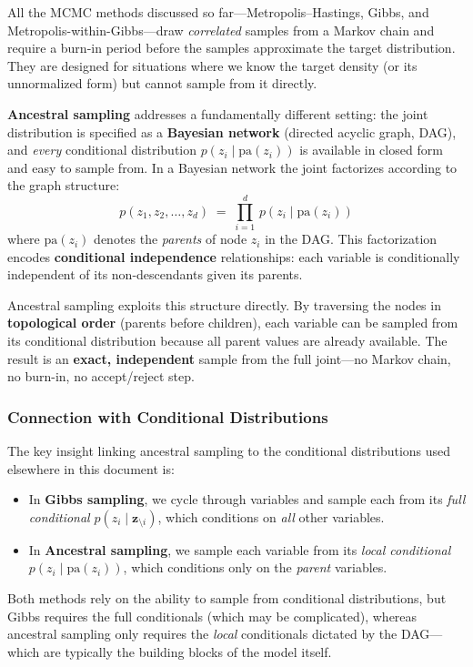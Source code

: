 \documentclass[12pt, a4paper]{article}
\begin{document}
All the MCMC methods discussed so far---Metropolis--Hastings,
Gibbs, and Metropolis-within-Gibbs---draw \emph{correlated}
samples from a Markov chain and require a burn-in period before
the samples approximate the target distribution.  They are
designed for situations where we know the target density (or its
unnormalized form) but cannot sample from it directly.

\textbf{Ancestral sampling} addresses a fundamentally different
setting: the joint distribution is specified as a
\textbf{Bayesian network} (directed acyclic graph, DAG), and
\emph{every} conditional distribution $p(z_i \mid \mathrm{pa}(z_i))$
is available in closed form and easy to sample from.  In a Bayesian
network the joint factorizes according to the graph structure:
\begin{equation}
    p(z_1, z_2, \ldots, z_d)
    \;=\;
    \prod_{i=1}^{d}\, p\!\left(z_i \mid \mathrm{pa}(z_i)\right)
    \label{eq:bn_factorization}
\end{equation}
where $\mathrm{pa}(z_i)$ denotes the \emph{parents} of node $z_i$
in the DAG.  This factorization encodes \textbf{conditional
independence} relationships: each variable is conditionally
independent of its non-descendants given its parents.

Ancestral sampling exploits this structure directly.  By
traversing the nodes in \textbf{topological order} (parents
before children), each variable can be sampled from its
conditional distribution because all parent values are already
available.  The result is an \textbf{exact, independent} sample
from the full joint---no Markov chain, no burn-in, no
accept/reject step.

\subsubsection{Connection with Conditional Distributions}

The key insight linking ancestral sampling to the conditional
distributions used elsewhere in this document is:
\begin{itemize}
    \item In \textbf{Gibbs sampling}, we cycle through variables
          and sample each from its \emph{full conditional}
          $p(z_i \mid \mathbf{z}_{\setminus i})$, which
          conditions on \emph{all} other variables.
    \item In \textbf{Ancestral sampling}, we sample each
          variable from its \emph{local conditional}
          $p(z_i \mid \mathrm{pa}(z_i))$, which conditions
          only on the \emph{parent} variables.
\end{itemize}
Both methods rely on the ability to sample from conditional
distributions, but Gibbs requires the full conditionals (which
may be complicated), whereas ancestral sampling only requires
the \emph{local} conditionals dictated by the DAG---which are
typically the building blocks of the model itself.
\end{document}
